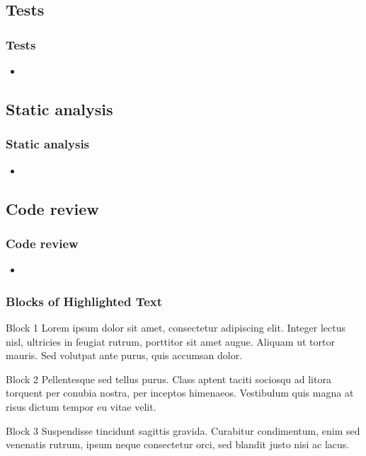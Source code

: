\documentclass{beamer}
\begin{document}
  \subsection{Tests}
    \begin{frame}
      \frametitle{Tests}
      \begin{itemize}
        \item
      \end{itemize}
    \end{frame}

  \subsection{Static analysis}
    \begin{frame}
    \frametitle{Static analysis}
    \begin{itemize}
    \item
    \end{itemize}
    \end{frame}

  \subsection{Code review}
    \begin{frame}
    \frametitle{Code review}
    \begin{itemize}
    \item
    \end{itemize}
    \end{frame}

\begin{frame}
\frametitle{Blocks of Highlighted Text}
\begin{block}{Block 1}
Lorem ipsum dolor sit amet, consectetur adipiscing elit. Integer lectus nisl, ultricies in feugiat rutrum, porttitor sit amet augue. Aliquam ut tortor mauris. Sed volutpat ante purus, quis accumsan dolor.
\end{block}

\begin{block}{Block 2}
Pellentesque sed tellus purus. Class aptent taciti sociosqu ad litora torquent per conubia nostra, per inceptos himenaeos. Vestibulum quis magna at risus dictum tempor eu vitae velit.
\end{block}

\begin{block}{Block 3}
Suspendisse tincidunt sagittis gravida. Curabitur condimentum, enim sed venenatis rutrum, ipsum neque consectetur orci, sed blandit justo nisi ac lacus.
\end{block}
\end{frame}
\end{document}
